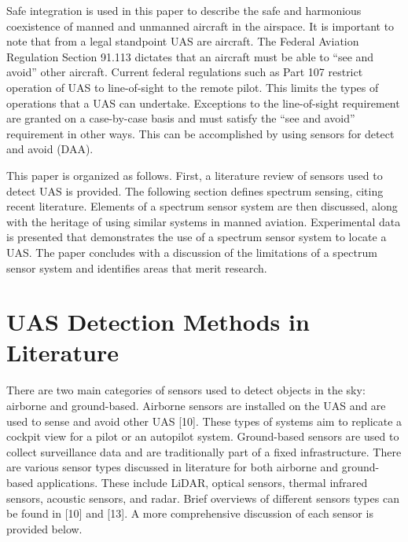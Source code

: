 \documentclass[journal,transmag]{IEEEtran}
\begin{document}
Safe integration is used in this paper to describe the safe and harmonious coexistence of manned and unmanned aircraft in the airspace. It is important to note that from a legal standpoint UAS are aircraft. The Federal Aviation Regulation Section 91.113 dictates that an aircraft must be able to “see and avoid” other aircraft.  Current federal regulations such as Part 107 restrict operation of UAS to line-of-sight to the remote pilot. This limits the types of operations that a UAS can undertake. Exceptions to the line-of-sight requirement are granted on a case-by-case basis and must satisfy the “see and avoid” requirement in other ways. This can be accomplished by using sensors for detect and avoid (DAA). 

This paper is organized as follows. First, a literature review of sensors used to detect UAS is provided. The following section defines spectrum sensing, citing recent literature. Elements of a spectrum sensor system are then discussed, along with the heritage of using similar systems in manned aviation. Experimental data is presented that demonstrates the use of a spectrum sensor system to locate a UAS. The paper concludes with a discussion of the limitations of a spectrum sensor system and identifies areas that merit research. 

\section{UAS Detection Methods in Literature}

There are two main categories of sensors used to detect objects in the sky: airborne and ground-based. Airborne sensors are installed on the UAS and are used to sense and avoid other UAS [10]. These types of systems aim to replicate a cockpit view for a pilot or an autopilot system. Ground-based sensors are used to collect surveillance data and are traditionally part of a fixed infrastructure. There are various sensor types discussed in literature for both airborne and ground-based applications. These include LiDAR, optical sensors, thermal infrared sensors, acoustic sensors, and radar.  Brief overviews of different sensors types can be found in [10] and [13]. A more comprehensive discussion of each sensor is provided below.
 
\end{document}
